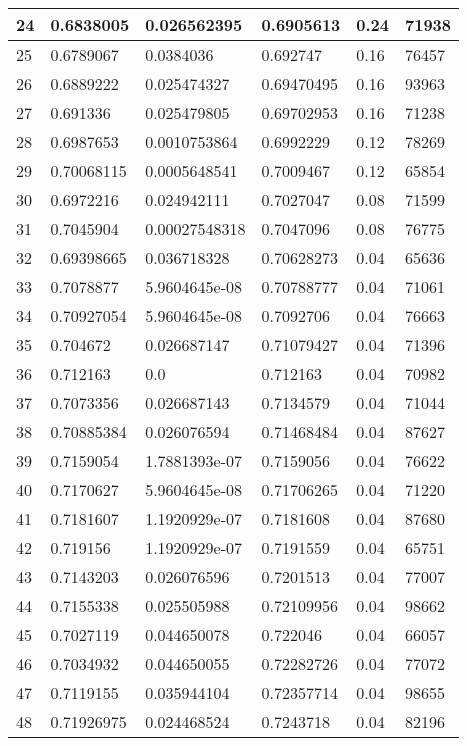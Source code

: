 \begin{longtable}{|l|l|l|l|l|l|}
24 & 0.6838005 & 0.026562395 & 0.6905613 & 0.24 & 71938 \\ \hline 
25 & 0.6789067 & 0.0384036 & 0.692747 & 0.16 & 76457 \\ \hline 
26 & 0.6889222 & 0.025474327 & 0.69470495 & 0.16 & 93963 \\ \hline 
27 & 0.691336 & 0.025479805 & 0.69702953 & 0.16 & 71238 \\ \hline 
28 & 0.6987653 & 0.0010753864 & 0.6992229 & 0.12 & 78269 \\ \hline 
29 & 0.70068115 & 0.0005648541 & 0.7009467 & 0.12 & 65854 \\ \hline 
30 & 0.6972216 & 0.024942111 & 0.7027047 & 0.08 & 71599 \\ \hline 
31 & 0.7045904 & 0.00027548318 & 0.7047096 & 0.08 & 76775 \\ \hline 
32 & 0.69398665 & 0.036718328 & 0.70628273 & 0.04 & 65636 \\ \hline 
33 & 0.7078877 & 5.9604645e-08 & 0.70788777 & 0.04 & 71061 \\ \hline 
34 & 0.70927054 & 5.9604645e-08 & 0.7092706 & 0.04 & 76663 \\ \hline 
35 & 0.704672 & 0.026687147 & 0.71079427 & 0.04 & 71396 \\ \hline 
36 & 0.712163 & 0.0 & 0.712163 & 0.04 & 70982 \\ \hline 
37 & 0.7073356 & 0.026687143 & 0.7134579 & 0.04 & 71044 \\ \hline 
38 & 0.70885384 & 0.026076594 & 0.71468484 & 0.04 & 87627 \\ \hline 
39 & 0.7159054 & 1.7881393e-07 & 0.7159056 & 0.04 & 76622 \\ \hline 
40 & 0.7170627 & 5.9604645e-08 & 0.71706265 & 0.04 & 71220 \\ \hline 
41 & 0.7181607 & 1.1920929e-07 & 0.7181608 & 0.04 & 87680 \\ \hline 
42 & 0.719156 & 1.1920929e-07 & 0.7191559 & 0.04 & 65751 \\ \hline 
43 & 0.7143203 & 0.026076596 & 0.7201513 & 0.04 & 77007 \\ \hline 
44 & 0.7155338 & 0.025505988 & 0.72109956 & 0.04 & 98662 \\ \hline 
45 & 0.7027119 & 0.044650078 & 0.722046 & 0.04 & 66057 \\ \hline 
46 & 0.7034932 & 0.044650055 & 0.72282726 & 0.04 & 77072 \\ \hline 
47 & 0.7119155 & 0.035944104 & 0.72357714 & 0.04 & 98655 \\ \hline 
48 & 0.71926975 & 0.024468524 & 0.7243718 & 0.04 & 82196 \\ \hline 

\end{longtable}
